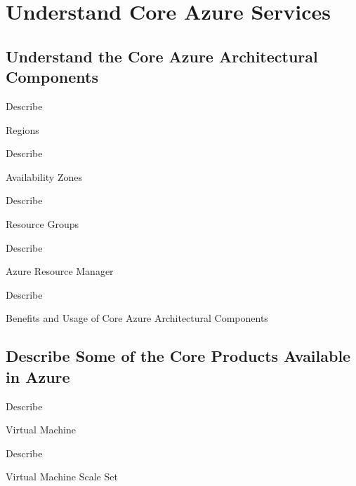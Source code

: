 \documentclass{scrartcl}
\newenvironment{flashcard}[2][]{%
    #1
    \vfill
    \centerline{\Large{#2}}
    \vfill
    \newpage
}
{\newpage}
\newcommand{\sectioncard}[1]{
    \vspace*{\stretch{1}}
    \section{#1}
    \vspace*{\stretch{1}}
    \pagebreak
}
\newcommand{\subsectioncard}[1]{
    \vspace*{\stretch{1}}
    \subsection{#1}
    \vspace*{\stretch{1}}
    \pagebreak
}
\begin{document}
    \sectioncard{Understand Core Azure Services}

    \subsectioncard{Understand the Core Azure Architectural Components}

    \begin{flashcard}[Describe]{Regions}

    \end{flashcard}

    \begin{flashcard}[Describe]{Availability Zones}

    \end{flashcard}

    \begin{flashcard}[Describe]{Resource Groups}

    \end{flashcard}

    \begin{flashcard}[Describe]{Azure Resource Manager}

    \end{flashcard}

    \begin{flashcard}[Describe]{Benefits and Usage of Core Azure Architectural Components}

    \end{flashcard}

    \subsectioncard{Describe Some of the Core Products Available in Azure}


    \begin{flashcard}[Describe]{Virtual Machine}

    \end{flashcard}

    \begin{flashcard}[Describe]{Virtual Machine Scale Set}

    \end{flashcard}
\end{document}
